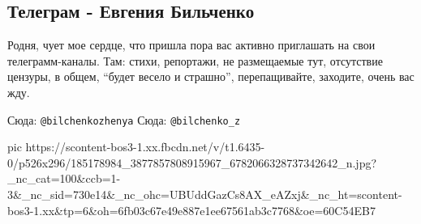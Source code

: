  
 
 
 
 
\subsection{Телеграм - Евгения Бильченко}
\label{sec:10_05_2021.fb.bilchenko_evgenia.2.tg}

Родня, чует мое сердце, что пришла пора вас активно приглашать на свои
телеграмм-каналы. Там: стихи, репортажи, не размещаемые тут, отсутствие
цензуры, в общем, \enquote{будет весело и страшно}, перепащивайте, заходите, очень вас
жду. 

Сюда: \verb|@bilchenkozhenya|
Сюда: \verb|@bilchenko_z|

\ifcmt
  pic https://scontent-bos3-1.xx.fbcdn.net/v/t1.6435-0/p526x296/185178984_3877857808915967_6782066328737342642_n.jpg?_nc_cat=100&ccb=1-3&_nc_sid=730e14&_nc_ohc=UBUddGazCs8AX_eAZxj&_nc_ht=scontent-bos3-1.xx&tp=6&oh=6fb03c67e49e887e1ee67561ab3c7768&oe=60C54EB7
\fi

